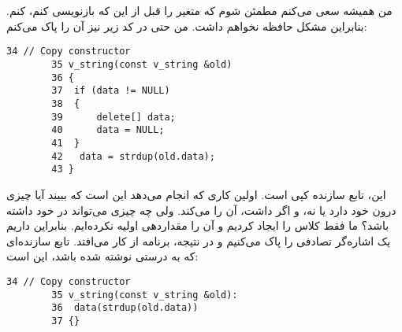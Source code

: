 \section{}
\paragraph{}\label{answer:115}
من همیشه سعی می‌کنم مطمئن شوم که متغیر  را قبل از این که بازنویسی کنم،  کنم. بنابراین مشکل حافظه نخواهم داشت. من حتی در کد زیر نیز آن را پاک می‌کنم:
\begin{LTR}
    \begin{lstlisting}[style=C++Style]
        34 // Copy constructor
        35 v_string(const v_string &old)
        36 {
        37 	if (data != NULL)
        38 	{
        39 		delete[] data;
        40 		data = NULL;
        41 	}
        42	 data = strdup(old.data);
        43 }
    \end{lstlisting}
\end{LTR}

این، تابع سازنده کپی است. اولین کاری که انجام می‌دهد این است که ببیند آیا  چیزی درون خود دارد یا نه، و اگر داشت، آن را  می‌کند. ولی  چه چیزی می‌تواند در خود داشته باشد؟ ما فقط کلاس را ایجاد کردیم و آن را مقداردهی اولیه نکرده‌ایم. بنابراین داریم یک اشاره‌گر تصادفی را پاک می‌کنیم و در نتیجه، برنامه از کار می‌افتد. تابع سازنده‌ای که به درستی نوشته شده باشد، این است:
\begin{LTR}
    \begin{lstlisting}[style=C++Style]
        34 // Copy constructor
        35 v_string(const v_string &old):
        36 	data(strdup(old.data))
        37 {}
    \end{lstlisting}
\end{LTR}

